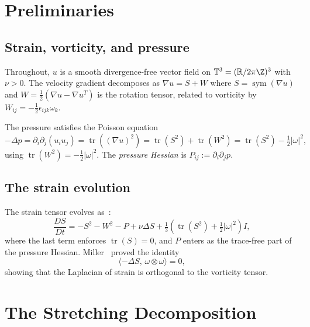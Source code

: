 \documentclass[11pt,a4paper]{article}
\theoremstyle{plain}
\theoremstyle{definition}
\theoremstyle{remark}
\newcommand{\R}{\mathbb{R}}
\newcommand{\T}{\mathbb{T}}
\DeclareMathOperator{\tr}{tr}
\DeclareMathOperator{\sym}{sym}
\begin{document}
\section{Preliminaries}\label{sec:prelim}

\subsection{Strain, vorticity, and pressure}

Throughout, $u$ is a smooth divergence-free vector field
on $\T^3 = (\R/2\pi\Z)^3$ with $\nu>0$.  The velocity
gradient decomposes as
$\nabla u = S + W$ where $S = \sym(\nabla u)$ and
$W = \frac{1}{2}(\nabla u - \nabla u^T)$ is the
rotation tensor, related to vorticity by
$W_{ij} = -\frac{1}{2}\epsilon_{ijk}\omega_k$.

The pressure satisfies the Poisson equation
\begin{equation}\label{eq:pressure-poisson}
-\Delta p = \partial_i\partial_j(u_i u_j)
= \tr((\nabla u)^2) = \tr(S^2) + \tr(W^2)
= \tr(S^2) - \tfrac{1}{2}|\omega|^2,
\end{equation}
using $\tr(W^2) = -\frac{1}{2}|\omega|^2$.  The
\emph{pressure Hessian} is
$P_{ij} := \partial_i\partial_j p$.

\subsection{The strain evolution}

The strain tensor evolves
as~\cite{Miller24,GalantiGibbon97}:
\begin{equation}\label{eq:strain-evol}
\frac{DS}{Dt} = -S^2 - W^2 - P
+ \nu\Delta S + \tfrac{1}{3}(\tr(S^2)
+ \tfrac{1}{2}|\omega|^2)I,
\end{equation}
where the last term enforces $\tr(S)=0$, and
$P$ enters as the trace-free part of the
pressure Hessian.  Miller~\cite{Miller24} proved
the identity
\begin{equation}\label{eq:miller}
\langle -\Delta S,\, \omega\otimes\omega\rangle = 0,
\end{equation}
showing that the Laplacian of strain is orthogonal to
the vorticity tensor.


\section{The Stretching Decomposition}\label{sec:decomp}
\end{document}
